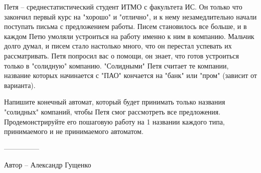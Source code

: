 \question
Петя -- среднестатистический студент ИТМО с факультета ИС. Он только что закончил первый курс на "хорошо" и "отлично", и к нему незамедлительно начали поступать письма с предложением работы. Писем становилось все больше, и в каждом Петю умоляли устроиться на работу именно к ним в компанию. Мальчик долго думал, и писем стало настолько много, что он перестал успевать их рассматривать. Петя попросил вас о помощи, он знает, что готов устроиться только в "солидную" компанию. "Солидными" Петя считает те компании, название которых начинается с "ПАО" кончается на "банк" или "пром" (зависит от варианта). 

Напишите конечный автомат, который будет принимать только названия "солидных" компаний, чтобы Петя смог рассмотреть все предложения. Продемонстрируйте его пошаговую работу на 1 названии каждого типа, принимаемого и не принимаемого автоматом.

---------------

Автор -- Александр Гущенко
